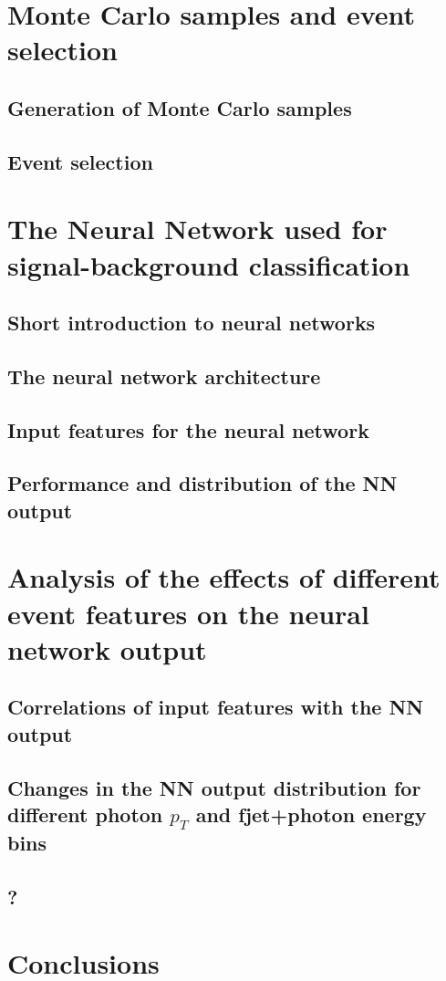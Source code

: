 \chapter{Monte Carlo samples and event selection}
\section{Generation of Monte Carlo samples}
\section{Event selection}
\chapter{The Neural Network used for signal-background classification}
\section{Short introduction to neural networks}
\section{The neural network architecture}
\section{Input features for the neural network}
\section{Performance and distribution of the NN output}
\chapter{Analysis of the effects of different event features on the neural network output}
\section{Correlations of input features with the NN output}
\section{Changes in the NN output distribution for different photon \texorpdfstring{$p_T$}{TEXT} and fjet+photon energy bins}
\section{?}
\chapter{Conclusions}